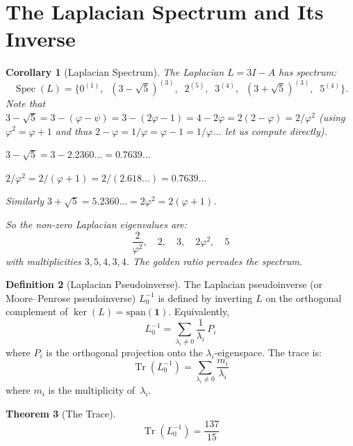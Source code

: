 \documentclass[11pt,a4paper]{article}
\theoremstyle{plain}
\newtheorem{theorem}{Theorem}[section]
\newtheorem{corollary}[theorem]{Corollary}
\theoremstyle{definition}
\newtheorem{definition}[theorem]{Definition}
\newcommand{\vp}{\varphi}
\newcommand{\ps}{\psi}
\DeclareMathOperator{\Tr}{Tr}
\DeclareMathOperator{\Spec}{Spec}
\begin{document}
\section{The Laplacian Spectrum and Its Inverse}\label{sec:trace}

\begin{corollary}[Laplacian Spectrum]\label{cor:laplacian-spec}
The Laplacian $L = 3I - A$ has spectrum:
\[
  \Spec(L) = \Big\{
    0^{(1)},\;\;
    (3 - \sqrt{5})^{(3)},\;\;
    2^{(5)},\;\;
    3^{(4)},\;\;
    (3 + \sqrt{5})^{(3)},\;\;
    5^{(4)}
  \Big\}.
\]
Note that $3 - \sqrt{5} = 3 - (\vp - \ps) = 3 - (2\vp - 1) = 4 - 2\vp
= 2(2 - \vp) = 2/\vp^2$ (using $\vp^2 = \vp + 1$ and thus
$2 - \vp = 1/\vp = \vp - 1 = 1/\vp$... let us compute directly).

$3 - \sqrt{5} = 3 - 2.2360\ldots = 0.7639\ldots$

$2/\vp^2 = 2/(\vp + 1) = 2/(2.618\ldots) = 0.7639\ldots$ \checkmark

Similarly $3 + \sqrt{5} = 5.2360\ldots = 2\vp^2 = 2(\vp + 1)$.

So the non-zero Laplacian eigenvalues are:
\[
  \frac{2}{\vp^2},\quad 2,\quad 3,\quad 2\vp^2,\quad 5
\]
with multiplicities $3, 5, 4, 3, 4$.  The golden ratio pervades the
spectrum.
\end{corollary}

\begin{definition}[Laplacian Pseudoinverse]\label{def:pseudoinverse}
The Laplacian pseudoinverse (or Moore--Penrose pseudoinverse) $L_0^{-1}$
is defined by inverting $L$ on the orthogonal complement of $\ker(L) =
\mathrm{span}(\mathbf{1})$.  Equivalently,
\[
  L_0^{-1} = \sum_{\lambda_i \ne 0} \frac{1}{\lambda_i}\,P_i
\]
where $P_i$ is the orthogonal projection onto the $\lambda_i$-eigenspace.
The trace is:
\[
  \Tr(L_0^{-1}) = \sum_{\lambda_i \ne 0} \frac{m_i}{\lambda_i}
\]
where $m_i$ is the multiplicity of~$\lambda_i$.
\end{definition}

\begin{theorem}[The Trace]\label{thm:trace}
\[
  \boxed{\;
    \Tr(L_0^{-1}) = \frac{137}{15}
  \;}
\]
\end{theorem}
\end{document}
